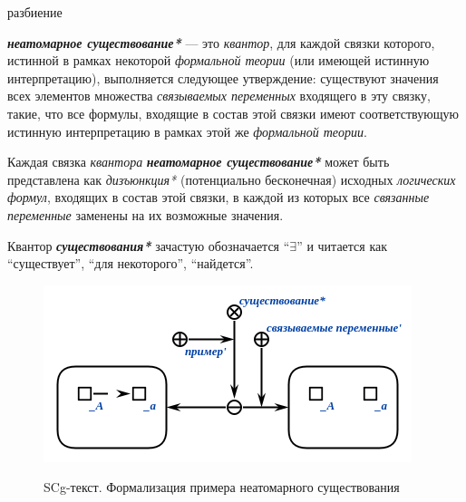 \begin{SCn}
\begin{scnrelfromset}{разбиение}
\end{scnrelfromset}

\end{SCn}

\textbf{\textit{неатомарное существование*}} --- это \textit{квантор}, для каждой связки которого, истинной в рамках некоторой \textit{формальной теории} (или имеющей истинную интерпретацию), выполняется следующее утверждение: существуют значения всех элементов множества \textit{связываемых переменных\scnrolesign} входящего в эту связку, такие, что все формулы, входящие в состав этой связки имеют соответствующую истинную интерпретацию в рамках этой же \textit{формальной теории}.

Каждая связка \textit{квантора} \textbf{\textit{неатомарное существование*}} может быть представлена как \textit{дизъюнкция*} (потенциально бесконечная) исходных \textit{логических формул}, входящих в состав этой связки, в каждой из которых все \textit{связанные переменные\scnrolesign} заменены на их возможные значения.

Квантор \textbf{\textit{существования*}} зачастую обозначается ``$\exists$'' и читается как ``существует'', ``для некоторого'', ``найдется''.

\begin{figure}[H]
\caption{SCg-текст. Формализация примера неатомарного существования}
\includegraphics[scale=0.8]{author/part2/figures/logic/non_atomicExistence.png}
\label{fig:non_atomic_existence}
\end{figure}

\begin{SCn}
\end{SCn}

